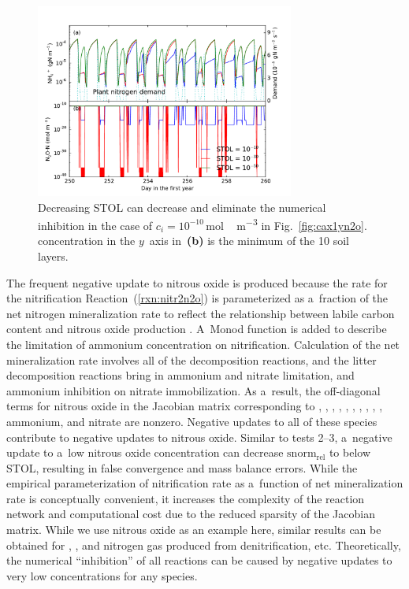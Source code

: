 \documentclass[gmd,noline]{copernicus}
\begin{document}
\begin{figure}[t]
\includegraphics[width=85mm]{gmd-2015-254-f08.pdf}
\caption{Decreasing STOL can decrease and eliminate the numerical inhibition
in the case of $c_i = 10^{-10}$\,\unit{mol\,m^{-3}} in
Fig.~\ref{fig:cax1yn2o}.  concentration in the $y$~axis
in~\textbf{(b)}
 is the minimum of the 10 soil layers.}
\label{fig:cax1yn2osto0}
\end{figure}


      The frequent negative update to nitrous oxide is produced because the
      rate for the nitrification Reaction~(\ref{rxn:nitr2n2o}) is
      parameterized as a~fraction of the net nitrogen mineralization rate to
      reflect the relationship between labile carbon content and nitrous
      oxide production \citep{Parton1996}. A~Monod function is added to
      describe the limitation of ammonium concentration on nitrification.
      Calculation of the net mineralization rate involves all of the
      decomposition reactions, and the litter decomposition reactions bring
      in ammonium and nitrate limitation, and ammonium inhibition on nitrate
      immobilization. As a~result, the off-diagonal terms for nitrous oxide
      in the Jacobian matrix corresponding to , ,
      , , , , ,
      , , , ammonium, and nitrate are
      nonzero. Negative updates to all of these species contribute to
      negative updates to nitrous oxide. Similar to tests 2--3, a~negative
      update to a~low nitrous oxide concentration can decrease
      $\text{snorm}_{\text{rel}}$ to below STOL, resulting in false
      convergence and mass balance errors. While the empirical
      parameterization of nitrification rate as a~function of net
      mineralization rate is conceptually convenient, it increases the
      complexity of the reaction network and computational cost due to the
      reduced sparsity of the Jacobian matrix. While we use nitrous oxide as
      an example here, similar results can be obtained for ,
      , and nitrogen gas produced from denitrification,
      etc. Theoretically, the numerical ``inhibition'' of all reactions can
      be caused by negative updates to very low concentrations for any
      species.
\end{document}
